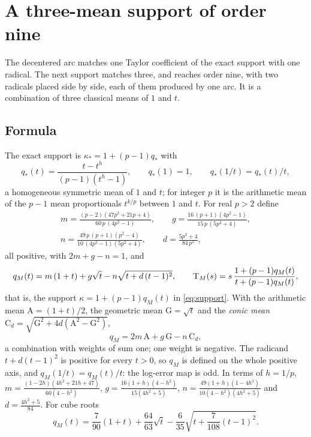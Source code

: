 \section{A three-mean support of order nine}\label{sec:mean}

The decentered arc matches one Taylor coefficient of the exact support with one radical. The next
support matches three, and reaches order nine, with two radicals placed side by side, each of them
produced by one arc. It is a combination of three classical means of $1$ and $t$.

\subsection{Formula}

The exact support is $\kappa_*=1+(p-1)q_*$ with
\[ q_*(t)=\frac{t-t^{h}}{(p-1)(t^{h}-1)},\qquad q_*(1)=1,\qquad q_*(1/t)=q_*(t)/t , \]
a homogeneous symmetric mean of $1$ and $t$; for integer $p$ it is the arithmetic mean of the $p-1$
mean proportionals $t^{k/p}$ between $1$ and $t$. For real $p>2$ define
\begin{equation}\label{eq:mcoeff}
\begin{gathered}
m=\frac{(p-2)(47p^{2}+21p+4)}{60\,p\,(4p^{2}-1)},\qquad
g=\frac{16\,(p+1)(4p^{2}-1)}{15\,p\,(5p^{2}+4)},\\[2pt]
n=\frac{49\,p\,(p+1)(p^{2}-4)}{10\,(4p^{2}-1)(5p^{2}+4)},\qquad
d=\frac{5p^{2}+4}{84\,p^{2}} ,
\end{gathered}
\end{equation}
all positive, with $2m+g-n=1$, and
\begin{equation}\label{eq:qM}
q_M(t)=m\,(1+t)+g\sqrt t-n\sqrt{t+d\,(t-1)^{2}},\qquad
\mathrm{T}_{M}(s)=s\,\frac{1+(p-1)q_M(t)}{t+(p-1)q_M(t)},
\end{equation}
that is, the support $\kappa=1+(p-1)q_M(t)$ in \eqref{eq:support}. With the arithmetic mean
$\mathrm A=(1+t)/2$, the geometric mean $\mathrm G=\sqrt t$ and the \emph{conic mean}
$\mathrm C_d=\sqrt{\mathrm G^{2}+4d(\mathrm A^{2}-\mathrm G^{2})}$,
\[ q_M=2m\,\mathrm A+g\,\mathrm G-n\,\mathrm C_d , \]
a combination with weights of sum one; one weight is negative. The radicand $t+d(t-1)^{2}$ is positive
for every $t>0$, so $q_M$ is defined on the whole positive axis, and $q_M(1/t)=q_M(t)/t$: the log-error
map is odd. In terms of $h=1/p$,
$m=\frac{(1-2h)(4h^{2}+21h+47)}{60(4-h^{2})}$, $g=\frac{16(1+h)(4-h^{2})}{15(4h^{2}+5)}$,
$n=\frac{49(1+h)(1-4h^{2})}{10(4-h^{2})(4h^{2}+5)}$ and $d=\frac{4h^{2}+5}{84}$. For cube roots
\begin{equation}\label{eq:qMcubic}
q_M(t)=\frac{7}{90}(1+t)+\frac{64}{63}\sqrt t-\frac{6}{35}\sqrt{t+\frac{7}{108}(t-1)^{2}} .
\end{equation}

